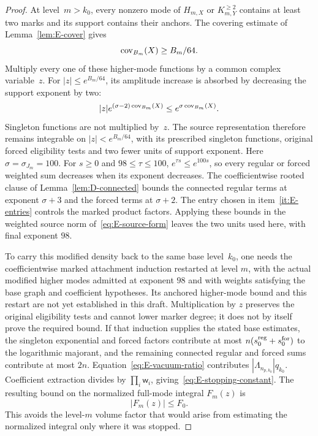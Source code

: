 \begin{proof}
At level~$m>k_0$, every nonzero mode of $H_{m,X}$ or $K^{\ge2}_{m,Y}$ contains at least two marks and its support contains their anchors. The covering estimate of Lemma~\ref{lem:E-cover} gives
\begin{equation*}
 \operatorname{cov}_{B_m}(X)\ge B_m/64.
\end{equation*}
Multiply every one of these higher-mode functions by a common complex variable~$z$. For $|z|\le e^{B_m/64}$, its amplitude increase is absorbed by decreasing the support exponent by two:
\begin{equation*}
 |z|e^{(\sigma-2)\operatorname{cov}_{B_m}(X)}
 \le e^{\sigma\operatorname{cov}_{B_m}(X)}.
\end{equation*}
Singleton functions are not multiplied by~$z$. The source representation therefore remains integrable on $|z|<e^{B_m/64}$, with its prescribed singleton functions, original forced eligibility tests and two fewer units of support exponent. Here $\sigma=\sigma_{J_m}=100$. For $s\ge0$ and $98\le\tau\le100$, $e^{\tau s}\le e^{100s}$, so every regular or forced weighted sum decreases when its exponent decreases. The coefficientwise rooted clause of Lemma~\ref{lem:D-connected} bounds the connected regular terms at exponent $\sigma+3$ and the forced terms at $\sigma+2$. The entry chosen in item~\ref{it:E-entries} controls the marked product factors. Applying these bounds in the weighted source norm of~\eqref{eq:E-source-form} leaves the two units used here, with final exponent $98$.

To carry this modified density back to the same base level~$k_0$, one needs the coefficientwise marked attachment induction restarted at level $m$, with the actual modified higher modes admitted at exponent $98$ and with weights satisfying the base graph and coefficient hypotheses. Its anchored higher-mode bound and this restart are not yet established in this draft. Multiplication by $z$ preserves the original eligibility tests and cannot lower marker degree; it does not by itself prove the required bound. If that induction supplies the stated base estimates, the singleton exponential and forced factors contribute at most $n(s_0^{\rm reg}+s_0^{\rm for})$ to the logarithmic majorant, and the remaining connected regular and forced sums contribute at most $2n$. Equation~\ref{eq:E-vacuum-ratio} contributes $|\Lambda_{n_{p,k_0}}|q_{k_0}$. Coefficient extraction divides by $\prod_i\mathsf w_i$, giving~\eqref{eq:E-stopping-constant}. The resulting bound on the normalized full-mode integral $F_m(z)$ is
\begin{equation*}
 |F_m(z)|\le F_0.
\end{equation*}
This avoids the level-$m$ volume factor that would arise from estimating the normalized integral only where it was stopped.


\end{proof}
